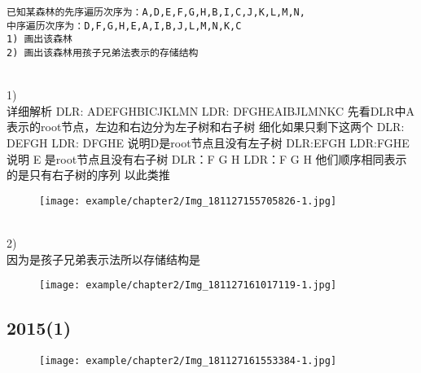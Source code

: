 \begin{lstlisting}[basicstyle=\small\ttfamily, caption={}, numbers=none]
已知某森林的先序遍历次序为：A,D,E,F,G,H,B,I,C,J,K,L,M,N,
中序遍历次序为：D,F,G,H,E,A,I,B,J,L,M,N,K,C
1) 画出该森林
2) 画出该森林用孩子兄弟法表示的存储结构
\end{lstlisting}
~\\
1)
~\\
详细解析\newline
DLR: {\color{red}A}{\color{blue}DEFGH}BICJKLMN\newline
LDR: {\color{blue}DFGHE}{\color{red}A}IBJLMNKC\newline
先看DLR中A表示的root节点，左边和右边分为左子树和右子树\newline
细化如果只剩下这两个\newline
DLR: {\color{blue}D}EFGH\newline
LDR: {\color{blue}D}FGHE\newline
说明D是root节点且没有左子树\newline
DLR:{\color{blue}E}FGH\newline
LDR:FGH{\color{blue}E}\newline
说明 E 是root节点且没有右子树\newline
DLR：F G H\newline
LDR：F G H\newline
他们顺序相同表示的是只有右子树的序列\newline
以此类推\newline
\begin{figure}[H]
	\centering  %
	\texttt{[image: example/chapter2/Img\_181127155705826-1.jpg]}
\end{figure}
~\\
2)
~\\
因为是孩子兄弟表示法所以存储结构是

\begin{figure}[H]
	\centering  %
	\texttt{[image: example/chapter2/Img\_181127161017119-1.jpg]}
\end{figure}

\subsection{2015(1)}

\begin{figure}[H]
	\centering  %
	\texttt{[image: example/chapter2/Img\_181127161553384-1.jpg]}
\end{figure}

